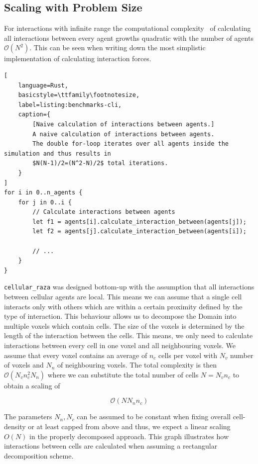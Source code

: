 \subsection{Scaling with Problem Size}
\label{section:scaling-with-problem-size}
For interactions with infinite range the computational complexity~\cite{Knuth1976} of calculating
all interactions between every agent growths quadratic with the number of agents $\mathcal{O}(N^2)$.
This can be seen when writing down the most simplistic implementation of calculating interaction
forces.

\begin{minipage}{\linewidth}\begin{lstlisting}[
    language=Rust,
    basicstyle=\ttfamily\footnotesize,
    label=listing:benchmarks-cli,
    caption={
        [Naive calculation of interactions between agents.]
        A naive calculation of interactions between agents.
        The double for-loop iterates over all agents inside the simulation and thus results in
        $N(N-1)/2=(N^2-N)/2$ total iterations.
    }
]
for i in 0..n_agents {
    for j in 0..i {
        // Calculate interactions between agents
        let f1 = agents[i].calculate_interaction_between(agents[j]);
        let f2 = agents[j].calculate_interaction_between(agents[i]);

        // ...
    }
}
\end{lstlisting}\end{minipage}

\texttt{cellular\_raza} was designed bottom-up with the assumption that all interactions between
cellular agents are local.
This means we can assume that a single cell interacts only with others which are within a certain
proximity defined by the type of interaction.
This behaviour allows us to decompose the Domain into multiple voxels which contain cells.
The size of the voxels is determined by the length of the interaction between the cells.
This means, we only need to calculate interactions between every cell in one voxel and all
neighbouring voxels.
We assume that every voxel contains an average of $n_c$ cells per voxel with $N_v$ number
of voxels and $N_n$ of neighbouring voxels.
The total complexity is then $\mathcal{O}(N_vn_c^2N_n)$ where we can substitute the
total number of cells $N=N_vn_c$ to obtain a scaling of

\begin{equation}
    \mathcal{O}(NN_nn_c)
\end{equation}

The parameters $N_n,N_c$ can be assumed to be constant when fixing overall cell-density or at least
capped from above and thus, we expect a linear scaling $O(N)$ in the properly decomposed approach.
This graph illustrates how interactions between cells are calculated when assuming a
rectangular decomposition scheme.

